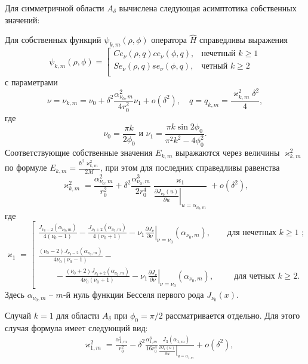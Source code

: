 Для симметричной области $A_\delta$ вычислена следующая асимптотика собственных значений:
\begin{theorem} 
Для собственных функций $\psi_{k, m}(\rho, \phi)$ оператора   $\hat{H}$ справедливы выражения
\begin{equation}
\psi_{k, m}(\rho, \phi) = 
\left[
\begin{array}{ll}
    Ce_\nu(\rho, q) ce_\nu(\phi, q) ,   &    \text{нечетный $k \geq 1$}\\
    Se_\nu(\rho, q) se_\nu(\phi, q) ,   &    \text{четный $k \geq 2$}\\
\end{array}
\right.\label{eq:fun}
\end{equation}
с параметрами
\[
\nu = \nu_{k,m} = \nu_0+ \delta^2 \frac{\alpha_{\nu_0, m}^2}{4 r_0^2}  \nu_1 + o(\delta^2),  \quad q=q_{k,m} = \dfrac{\varkappa_{k,m}^2 \delta^2}{4},
\]
где
$$\nu_0 = \frac{\pi k}{2\phi_0}\text{\ \  и\  \  }\nu_1=\frac{\pi k \sin 2\phi_0}{\pi^2 k^2 - 4\phi_0^2}  .$$
Соответствующие собственные значения $E_{k, m}$ выражаются через величины $\varkappa^2_{k, m}$ по формуле $E_{k, m} =  \frac{\hbar^2 \varkappa^2_{k, m}}{2M}$, при этом для последних  справедливы равенства
\begin{equation}
\varkappa^2_{k, m} = \dfrac{\alpha_{\nu_0, m}^2}{r_0^2} +
\delta^2 \dfrac{\alpha_{\nu_0, m}^3}{2 r_0^4}\dfrac{\varkappa_1 }{ \left.\frac{\partial J_{\nu_0}(u)}{\partial u}\right|_{u=\alpha_{\nu_0, m}} } + o(\delta^2),\label{eq:val}
\end{equation}
где
\begin{equation*}
    \varkappa_1 = 
    \left[
\begin{array}{ll}
\frac{J_{\nu_0-2}(\alpha_{\nu_0, m})}{4(\nu_0-1)} - \frac{J_{\nu_0+2}(\alpha_{\nu_0, m})}{4(\nu_0+1)} 
  - \nu_1 \left.\frac{\partial J_\nu}{\partial \nu}\right|_{\nu=\nu_0}(\alpha_{\nu_0, m}),\qquad \text{для нечетных $k\geq 1$ ;} \\[10pt]
\frac{(\nu_0 - 2)J_{\nu_0-2}(\alpha_{\nu_0, m})   }{4\nu_0 (\nu_0-1)} -\\
\qquad - \frac{(\nu_0 + 2)J_{\nu_0+2}(\alpha_{\nu_0, m})}{4\nu_0 (\nu_0+1)}  
- \nu_1 \left.\frac{\partial J_\nu}{\partial \nu}\right|_{\nu = \nu_0}(\alpha_{\nu_0, m}), \qquad \ \ \!    \text{для четных $k \geq 2$}.        
\end{array}
\right.
\end{equation*}
Здесь $\alpha_{\nu_0,m}$ --  $m$-й нуль функции Бесселя первого рода $J_{\nu_0}(x)$.
\end{theorem} 
Случай $k=1$ для области $A_\delta$ при $\phi_0=\pi/2$ рассматривается отдельно. Для этого случая формула имеет следующий вид:
\begin{align}
   & \varkappa_{1, m}^2 = \frac{\alpha_{1, m}^2}{r_0^2} - \delta^2 \frac{\alpha_{1, m}^3}{16r_0^4} 
    \frac{J_3(\alpha_{1, m})}{\left.\frac{\partial J_1 (u)}{\partial u}\right|_{u=\alpha_{1, m}}} 
    + o(\delta^2), \label{eq:valS1}
    \end{align}

